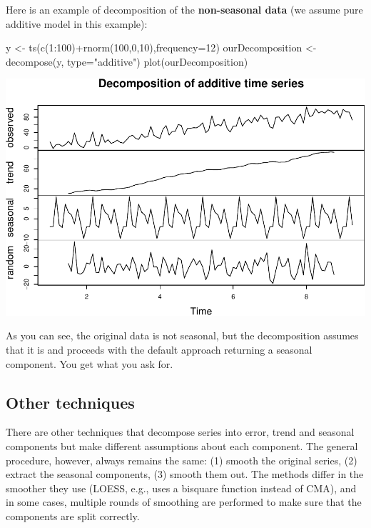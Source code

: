 \documentclass[
]{book}
\newenvironment{Shaded}{\begin{snugshade}}{\end{snugshade}}
\newcommand{\AttributeTok}[1]{\textcolor[rgb]{0.77,0.63,0.00}{#1}}
\newcommand{\DecValTok}[1]{\textcolor[rgb]{0.00,0.00,0.81}{#1}}
\newcommand{\FunctionTok}[1]{\textcolor[rgb]{0.00,0.00,0.00}{#1}}
\newcommand{\NormalTok}[1]{#1}
\newcommand{\OtherTok}[1]{\textcolor[rgb]{0.56,0.35,0.01}{#1}}
\newcommand{\SpecialCharTok}[1]{\textcolor[rgb]{0.00,0.00,0.00}{#1}}
\newcommand{\StringTok}[1]{\textcolor[rgb]{0.31,0.60,0.02}{#1}}
\theoremstyle{definition}
\theoremstyle{definition}
\theoremstyle{definition}
\theoremstyle{definition}
\theoremstyle{remark}
\begin{document}
Here is an example of decomposition of the \textbf{non-seasonal data} (we assume pure additive model in this example):

\begin{Shaded}
\begin{Highlighting}[]
\NormalTok{y }\OtherTok{\textless{}{-}} \FunctionTok{ts}\NormalTok{(}\FunctionTok{c}\NormalTok{(}\DecValTok{1}\SpecialCharTok{:}\DecValTok{100}\NormalTok{)}\SpecialCharTok{+}\FunctionTok{rnorm}\NormalTok{(}\DecValTok{100}\NormalTok{,}\DecValTok{0}\NormalTok{,}\DecValTok{10}\NormalTok{),}\AttributeTok{frequency=}\DecValTok{12}\NormalTok{)}
\NormalTok{ourDecomposition }\OtherTok{\textless{}{-}} \FunctionTok{decompose}\NormalTok{(y, }\AttributeTok{type=}\StringTok{"additive"}\NormalTok{)}
\FunctionTok{plot}\NormalTok{(ourDecomposition)}
\end{Highlighting}
\end{Shaded}

\includegraphics{Svetunkov--2022----ADAM_files/figure-latex/decomposeRandomNoise-1.pdf}

As you can see, the original data is not seasonal, but the decomposition assumes that it is and proceeds with the default approach returning a seasonal component. You get what you ask for.

\hypertarget{other-techniques}{%
\subsection{Other techniques}\label{other-techniques}}

There are other techniques that decompose series into error, trend and seasonal components but make different assumptions about each component. The general procedure, however, always remains the same: (1) smooth the original series, (2) extract the seasonal components, (3) smooth them out. The methods differ in the smoother they use (LOESS, e.g., uses a bisquare function instead of CMA), and in some cases, multiple rounds of smoothing are performed to make sure that the components are split correctly.
\end{document}
